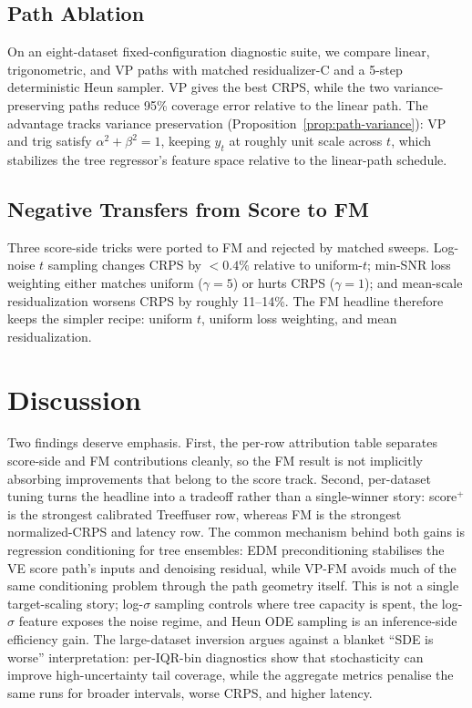 \documentclass{tpm2026}
\begin{document}
\subsection{Path Ablation}\label{sec:abl-path}
On an eight-dataset fixed-configuration diagnostic suite, we compare linear, trigonometric, and VP paths with matched residualizer-C and a 5-step deterministic Heun sampler. VP gives the best CRPS, while the two variance-preserving paths reduce 95\% coverage error relative to the linear path. The advantage tracks variance preservation (Proposition~\ref{prop:path-variance}): VP and trig satisfy $\alpha^2 + \beta^2 = 1$, keeping $y_t$ at roughly unit scale across $t$, which stabilizes the tree regressor's feature space relative to the linear-path schedule.

\subsection{Negative Transfers from Score to FM}\label{sec:abl-negative}
Three score-side tricks were ported to FM and rejected by matched sweeps. Log-noise $t$ sampling changes CRPS by $<0.4\%$ relative to uniform-$t$; min-SNR loss weighting either matches uniform ($\gamma=5$) or hurts CRPS ($\gamma=1$); and mean-scale residualization worsens CRPS by roughly 11--14\%. The FM headline therefore keeps the simpler recipe: uniform $t$, uniform loss weighting, and mean residualization.

\section{Discussion}\label{sec:disc}
Two findings deserve emphasis. First, the per-row attribution table separates score-side and FM contributions cleanly, so the FM result is not implicitly absorbing improvements that belong to the score track. Second, per-dataset tuning turns the headline into a tradeoff rather than a single-winner story: score$^+$ is the strongest calibrated Treeffuser row, whereas FM is the strongest normalized-CRPS and latency row. The common mechanism behind both gains is regression conditioning for tree ensembles: EDM preconditioning stabilises the VE score path's inputs and denoising residual, while VP-FM avoids much of the same conditioning problem through the path geometry itself. This is not a single target-scaling story; log-$\sigma$ sampling controls where tree capacity is spent, the log-$\sigma$ feature exposes the noise regime, and Heun ODE sampling is an inference-side efficiency gain. The large-dataset inversion argues against a blanket ``SDE is worse'' interpretation: per-IQR-bin diagnostics show that stochasticity can improve high-uncertainty tail coverage, while the aggregate metrics penalise the same runs for broader intervals, worse CRPS, and higher latency.
\end{document}
